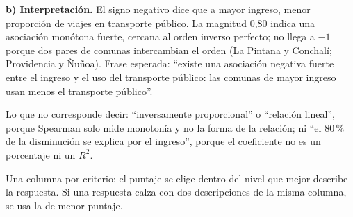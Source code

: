 \documentclass[11pt]{article}
\newcommand{\bloque}[1]{\vspace{6pt}{\bfseries #1}\vspace{2pt}\par}
\begin{document}
\medskip
\textbf{b) Interpretación.} El signo negativo dice que a mayor ingreso, menor proporción de viajes en transporte público. La magnitud 0,80 indica una asociación monótona fuerte, cercana al orden inverso perfecto; no llega a $-1$ porque dos pares de comunas intercambian el orden (La Pintana y Conchalí; Providencia y Ñuñoa). Frase esperada: ``existe una asociación negativa fuerte entre el ingreso y el uso del transporte público: las comunas de mayor ingreso usan menos el transporte público''.

Lo que no corresponde decir: ``inversamente proporcional'' o ``relación lineal'', porque Spearman solo mide monotonía y no la forma de la relación; ni ``el 80\,\% de la disminución se explica por el ingreso'', porque el coeficiente no es un porcentaje ni un $R^2$.

\newpage
\bloque{Rúbrica}

Una columna por criterio; el puntaje se elige dentro del nivel que mejor describe la respuesta. Si una respuesta calza con dos descripciones de la misma columna, se usa la de menor puntaje.
\end{document}
